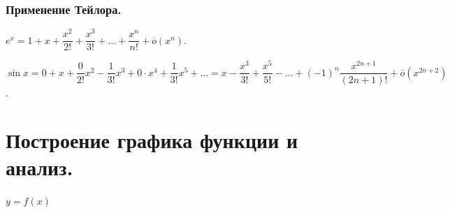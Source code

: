 \documentclass[12pt]{article}
\begin{document}
	\subsubsection{Применение Тейлора.}
	\begin{statement}
		$e^x = 1 + x + \dfrac{x^2}{2!} + \dfrac{x^3}{3!} + \dots + \dfrac{x^n}{n!} + \overline{o}(x^n)$.
	\end{statement}
	\begin{statement}
		$\sin x = 0 + x + \dfrac{0}{2!}x^2 - \dfrac{1}{3!}x^3 + 0 \cdot x^4 + \dfrac{1}{3!}x^5 + \dots = x - \dfrac{x^3}{3!} + \dfrac{x^5}{5!} - \dots + (-1)^n \dfrac{x^{2n + 1}}{(2n + 1)!} + \overline{o}(x^{2n + 2})$.
	\end{statement}
	
	\section{Построение графика функции и анализ.}
	
	$y = f(x)$
	
\end{document}
